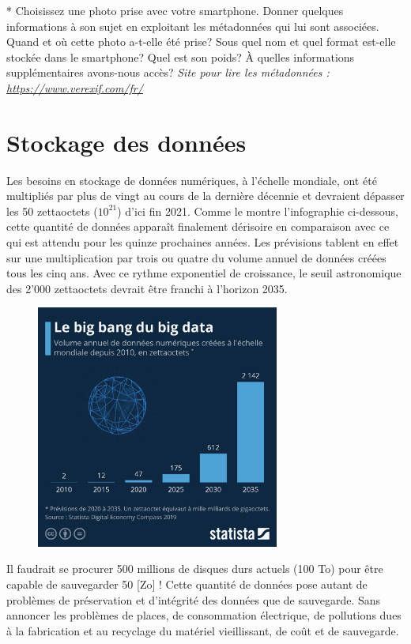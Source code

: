 \documentclass[11pt, a4paper]{book}
\begin{document}
\begin{exercice} *
Choisissez une photo prise avec votre smartphone. Donner quelques informations à son sujet en exploitant les métadonnées qui lui sont associées. Quand et où cette photo a-t-elle été prise? Sous quel nom et quel format est-elle stockée dans le smartphone? Quel est son poids? À quelles informations supplémentaires avons-nous accès?
\textit{Site pour lire les métadonnées : \url{https://www.verexif.com/fr/}}
\end{exercice}


\section{Stockage des données}

Les besoins en stockage de données numériques, à l’échelle mondiale, ont été multipliés par plus de vingt au cours de la dernière décennie et devraient dépasser les 50 zettaoctets ($10^{21}$) d’ici fin 2021. Comme le montre l’infographie ci-dessous, cette quantité de données apparaît finalement dérisoire en comparaison avec ce qui est attendu pour les quinze prochaines années. Les prévisions tablent en effet sur une multiplication par trois ou quatre du volume annuel de données créées tous les cinq ans. Avec ce rythme exponentiel de croissance, le seuil astronomique des 2’000 zettaoctets devrait être franchi à l’horizon 2035.

\begin{figure}[ht!]
\centering
\includegraphics[width=8cm]{images/statista.jpeg}
\end{figure}

Il faudrait se procurer 500 millions de disques durs actuels (100 To) pour être capable de sauvegarder 50 [Zo] ! Cette quantité de données pose autant de problèmes de préservation et d’intégrité des données que de sauvegarde. Sans annoncer les problèmes de places, de consommation électrique, de pollutions dues à la fabrication et au recyclage du matériel vieillissant, de coût et de sauvegarde.
\end{document}
